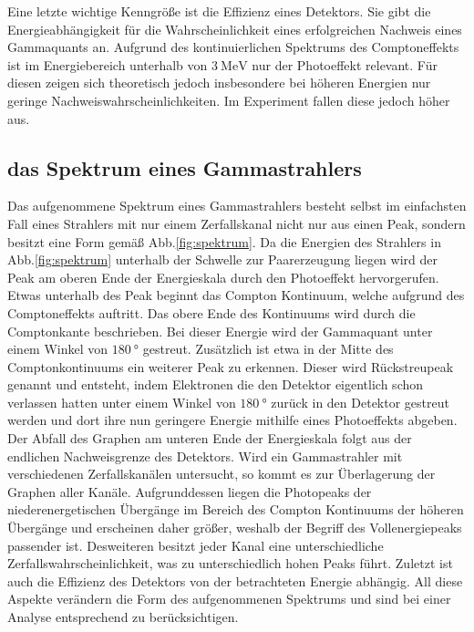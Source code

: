 Eine letzte wichtige Kenngröße ist die Effizienz eines Detektors. Sie gibt die Energieabhängigkeit für die Wahrscheinlichkeit eines erfolgreichen Nachweis eines Gammaquants an. Aufgrund des kontinuierlichen Spektrums des Comptoneffekts ist im Energiebereich unterhalb von $\SI{3}{\mega\electronvolt}$ nur der Photoeffekt relevant. Für diesen zeigen sich theoretisch jedoch insbesondere bei höheren Energien nur geringe Nachweiswahrscheinlichkeiten. Im Experiment fallen diese jedoch höher aus. 

\subsection{das Spektrum eines Gammastrahlers}
Das aufgenommene Spektrum eines Gammastrahlers besteht selbst im einfachsten Fall eines Strahlers mit nur einem Zerfallskanal nicht nur aus einen Peak, sondern besitzt eine Form gemäß Abb.\ref{fig:spektrum}. Da die Energien des Strahlers in Abb.\ref{fig:spektrum} unterhalb der Schwelle zur Paarerzeugung liegen wird der Peak am oberen Ende der Energieskala durch den Photoeffekt hervorgerufen. Etwas unterhalb des Peak beginnt das Compton Kontinuum, welche aufgrund des Comptoneffekts auftritt. Das obere Ende des Kontinuums wird durch die Comptonkante beschrieben. Bei dieser Energie wird der Gammaquant unter einem Winkel von $\SI{180}{\degree}$ gestreut. Zusätzlich ist etwa in der Mitte des Comptonkontinuums ein weiterer Peak zu erkennen. Dieser wird Rückstreupeak genannt und entsteht, indem Elektronen die den Detektor eigentlich schon verlassen hatten unter einem Winkel von $\SI{180}{\degree}$ zurück in den Detektor gestreut werden und dort ihre nun geringere Energie mithilfe eines Photoeffekts abgeben. Der Abfall des Graphen am unteren Ende der Energieskala folgt aus der endlichen Nachweisgrenze des Detektors. Wird ein Gammastrahler mit verschiedenen Zerfallskanälen untersucht, so kommt es zur Überlagerung der Graphen aller Kanäle. Aufgrunddessen liegen die Photopeaks der niederenergetischen Übergänge im Bereich des Compton Kontinuums der höheren Übergänge und erscheinen daher größer, weshalb der Begriff des Vollenergiepeaks passender ist. Desweiteren besitzt jeder Kanal eine unterschiedliche Zerfallswahrscheinlichkeit, was zu unterschiedlich hohen Peaks führt. Zuletzt ist auch die Effizienz des Detektors von der betrachteten Energie abhängig. All diese Aspekte verändern die Form des aufgenommenen Spektrums und sind bei einer Analyse entsprechend zu berücksichtigen.